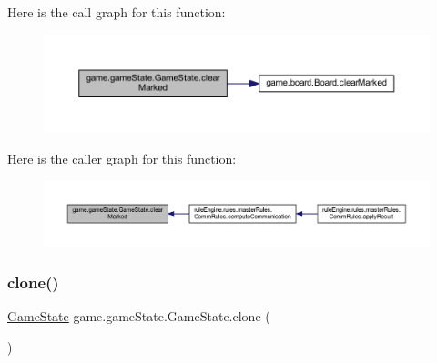 Here is the call graph for this function\+:
\nopagebreak
\begin{figure}[H]
\begin{center}
\leavevmode
\includegraphics[width=350pt]{classgame_1_1game_state_1_1_game_state_a8d1aba23400ae5b7cbd54af6514c83cc_cgraph}
\end{center}
\end{figure}
Here is the caller graph for this function\+:
\nopagebreak
\begin{figure}[H]
\begin{center}
\leavevmode
\includegraphics[width=350pt]{classgame_1_1game_state_1_1_game_state_a8d1aba23400ae5b7cbd54af6514c83cc_icgraph}
\end{center}
\end{figure}
\mbox{\label{classgame_1_1game_state_1_1_game_state_acb0b76d0c2eb02659818962cd2894d3a}} 
\subsubsection{\texorpdfstring{clone()}{clone()}}
{\footnotesize\ttfamily \mbox{\hyperlink{classgame_1_1game_state_1_1_game_state}{Game\+State}} game.\+game\+State.\+Game\+State.\+clone (\begin{DoxyParamCaption}{ }\end{DoxyParamCaption})\hspace{0.3cm}{\ttfamily [inline]}}

